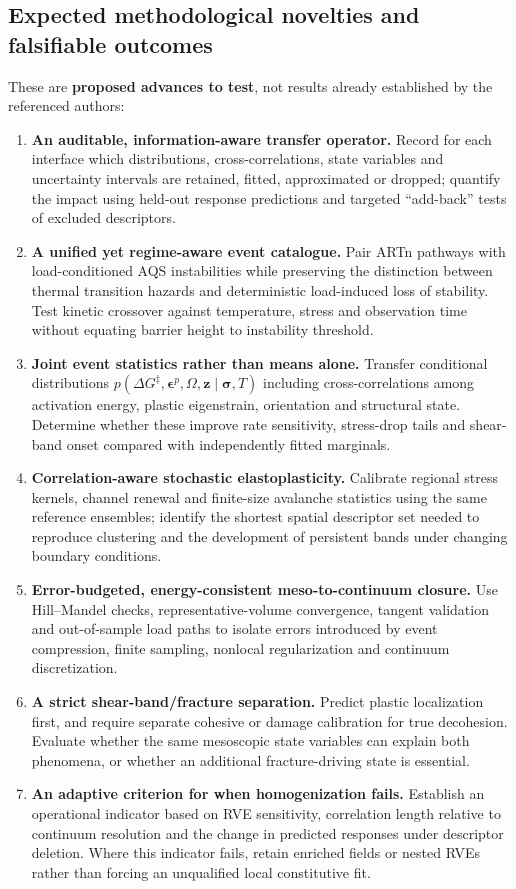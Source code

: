 \documentclass[11pt,a4paper]{article}
\begin{document}
\subsection{Expected methodological novelties and falsifiable outcomes}
These are \textbf{proposed advances to test}, not results already established by the referenced authors:
\begin{enumerate}[leftmargin=*,itemsep=3pt]
\item \textbf{An auditable, information-aware transfer operator.} Record for each interface which distributions, cross-correlations, state variables and uncertainty intervals are retained, fitted, approximated or dropped; quantify the impact using held-out response predictions and targeted ``add-back'' tests of excluded descriptors.
\item \textbf{A unified yet regime-aware event catalogue.} Pair ARTn pathways with load-conditioned AQS instabilities while preserving the distinction between thermal transition hazards and deterministic load-induced loss of stability. Test kinetic crossover against temperature, stress and observation time without equating barrier height to instability threshold.
\item \textbf{Joint event statistics rather than means alone.} Transfer conditional distributions $p(\Delta G^\ddagger,\boldsymbol\epsilon^{p},\Omega,\mathbf z\mid\boldsymbol\sigma,T)$ including cross-correlations among activation energy, plastic eigenstrain, orientation and structural state. Determine whether these improve rate sensitivity, stress-drop tails and shear-band onset compared with independently fitted marginals.
\item \textbf{Correlation-aware stochastic elastoplasticity.} Calibrate regional stress kernels, channel renewal and finite-size avalanche statistics using the same reference ensembles; identify the shortest spatial descriptor set needed to reproduce clustering and the development of persistent bands under changing boundary conditions.
\item \textbf{Error-budgeted, energy-consistent meso-to-continuum closure.} Use Hill--Mandel checks, representative-volume convergence, tangent validation and out-of-sample load paths to isolate errors introduced by event compression, finite sampling, nonlocal regularization and continuum discretization.
\item \textbf{A strict shear-band/fracture separation.} Predict plastic localization first, and require separate cohesive or damage calibration for true decohesion. Evaluate whether the same mesoscopic state variables can explain both phenomena, or whether an additional fracture-driving state is essential.
\item \textbf{An adaptive criterion for when homogenization fails.} Establish an operational indicator based on RVE sensitivity, correlation length relative to continuum resolution and the change in predicted responses under descriptor deletion. Where this indicator fails, retain enriched fields or nested RVEs rather than forcing an unqualified local constitutive fit.
\end{enumerate}
\end{document}
